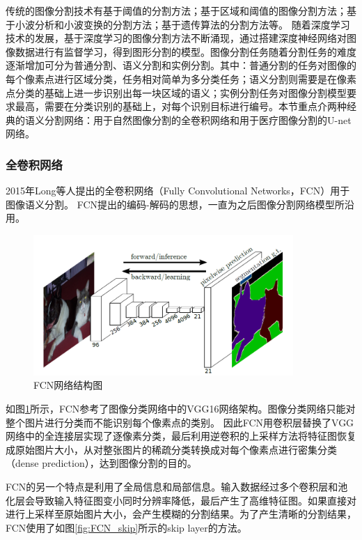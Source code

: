 传统的图像分割技术有基于阈值的分割方法；基于区域和阈值的图像分割方法；基于小波分析和小波变换的分割方法；基于遗传算法的分割方法等。
随着深度学习技术的发展，基于深度学习的图像分割方法不断涌现，通过搭建深度神经网络对图像数据进行有监督学习，得到图形分割的模型。图像分割任务随着分割任务的难度逐渐增加可分为普通分割、语义分割和实例分割。其中：普通分割的任务对图像的每个像素点进行区域分类，任务相对简单为多分类任务；语义分割则需要是在像素点分类的基础上进一步识别出每一块区域的语义；实例分割任务对图像分割模型要求最高，需要在分类识别的基础上，对每个识别目标进行编号。本节重点介两种经典的语义分割网络：用于自然图像分割的全卷积网络和用于医疗图像分割的U-net网络。


\subsubsection{全卷积网络}
2015年Long等人提出的全卷积网络（Fully Convolutional Networks，FCN）用于图像语义分割\cite{Long2015Fully}。
FCN提出的编码-解码的思想，一直为之后图像分割网络模型所沿用。

\begin{figure}[htp]
	\centering
	\includegraphics[width=0.88\textwidth]{figures/FCN.png}
	\caption{FCN网络结构图}
	\label{fig:FCN}
\end{figure}

如图\ref{fig:FCN}所示，FCN参考了图像分类网络中的VGG16\cite{2014Very}网络架构。图像分类网络只能对整个图片进行分类而不能识别每个像素点的类别。
因此FCN用卷积层替换了VGG网络中的全连接层实现了逐像素分类，最后利用逆卷积的上采样方法将特征图恢复成原始图片大小，从对整张图片的稀疏分类转换成对每个像素点进行密集分类（dense prediction），达到图像分割的目的。

FCN的另一个特点是利用了全局信息和局部信息。输入数据经过多个卷积层和池化层会导致输入特征图变小同时分辨率降低，最后产生了高维特征图。如果直接对进行上采样至原始图片大小，会产生模糊的分割结果。为了产生清晰的分割结果，FCN使用了如图\ref{fig:FCN_skip}所示的skip layer的方法。

